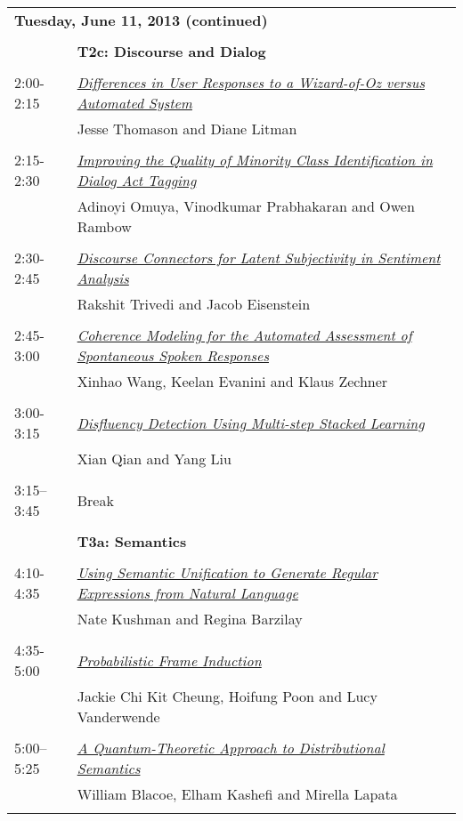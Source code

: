 \begin{tabular}{p{20mm}p{138mm}}
\\
\multicolumn{2}{l}{\bf Tuesday, June 11, 2013
 (continued)} \\\\
 & {\bf T2c: Discourse and Dialog
} \\
\\
2:00-2:15 & \hyperlink{page.796}{\em Differences in User Responses to a Wizard-of-Oz versus Automated System}\\
         & Jesse Thomason and Diane Litman \\
\\

2:15-2:30 & \hyperlink{page.802}{\em Improving the Quality of Minority Class Identification in Dialog Act Tagging}\\
         & Adinoyi Omuya, Vinodkumar Prabhakaran and Owen Rambow \\
\\

2:30-2:45 & \hyperlink{page.808}{\em Discourse Connectors for Latent Subjectivity in Sentiment Analysis}\\
         & Rakshit Trivedi and Jacob Eisenstein \\
\\

2:45-3:00 & \hyperlink{page.814}{\em Coherence Modeling for the Automated Assessment of Spontaneous Spoken Responses}\\
         & Xinhao Wang, Keelan Evanini and Klaus Zechner \\
\\

3:00-3:15 & \hyperlink{page.820}{\em Disfluency Detection Using Multi-step Stacked Learning}\\
         & Xian Qian and Yang Liu \\
\\

3:15--3:45 & Break
 \\
\\
 & {\bf T3a: Semantics
} \\
\\
4:10-4:35 & \hyperlink{page.826}{\em Using Semantic Unification to Generate Regular Expressions from Natural Language}\\
         & Nate Kushman and Regina Barzilay \\
\\

4:35-5:00 & \hyperlink{page.837}{\em Probabilistic Frame Induction}\\
         & Jackie Chi Kit Cheung, Hoifung Poon and Lucy Vanderwende \\
\\

5:00--5:25 & \hyperlink{page.847}{\em A Quantum-Theoretic Approach to Distributional Semantics}\\
         & William Blacoe, Elham Kashefi and Mirella Lapata \\
\\

\end{tabular}
